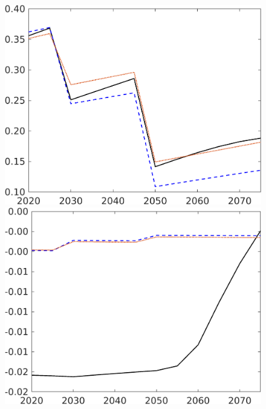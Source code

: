 \begin{figure}[h!!]
\begin{minipage}[]{0.32\textwidth}
\end{minipage}
\begin{minipage}[]{0.32\textwidth}
	\includegraphics[width=1\textwidth]{../../codding_model/own_basedOnFried/optimalPol_elastS_DisuSci/figures/all_1705/Utilcon_CompEffOPT_T_NoTaus_spillover0_noskill1_sep1_BN0_ineq0_red0_etaa0.79_lgd0.png}
\end{minipage}
\begin{minipage}[]{0.32\textwidth}
	\includegraphics[width=1\textwidth]{../../codding_model/own_basedOnFried/optimalPol_elastS_DisuSci/figures/all_1705/UtilSci_CompEffOPT_T_NoTaus_spillover0_noskill1_sep1_BN0_ineq0_red0_etaa0.79_lgd0.png}

\end{minipage}
\end{figure}
